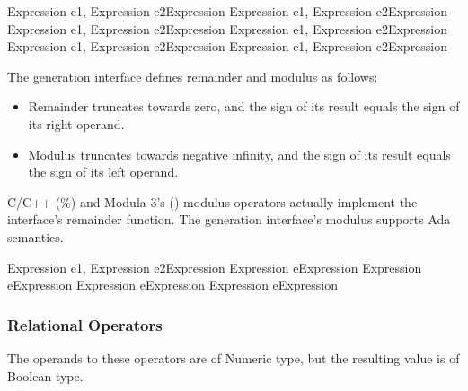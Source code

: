 	{Expression e1, Expression e2}{Expression}
	{Expression e1, Expression e2}{Expression}
	{Expression e1, Expression e2}{Expression}
	{Expression e1, Expression e2}{Expression}
	{Expression e1, Expression e2}{Expression}
	{Expression e1, Expression e2}{Expression}

\begin{functionality}
The generation interface defines remainder and modulus as follows:
\begin{itemize}
\item Remainder truncates towards zero, and the sign of
its result equals the sign of its right operand.
\item Modulus truncates towards negative infinity, and the sign of its
result equals the sign of its left operand. 
\end{itemize}
C/C++ (\%) and Modula-3's () modulus operators actually
implement the interface's remainder function.  The generation
interface's modulus supports Ada semantics.
\end{functionality}

	{Expression e1, Expression e2}{Expression}
	{Expression e}{Expression}
	{Expression e}{Expression}
	{Expression e}{Expression}
	{Expression e}{Expression}

\subsubsection{Relational Operators}
The operands to these operators are of Numeric type, but the resulting
value is of Boolean type.


